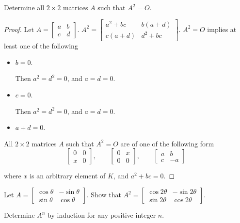 \begin{exercise}
    Determine all $2\times 2$ matrices $A$ such that $A^{2} = O$.
\end{exercise}

\begin{proof}
    Let $A = \begin{bmatrix}a & b \\ c & d\end{bmatrix}$. $A^{2} = \begin{bmatrix}a^{2} + bc & b(a + d) \\ c(a + d) & d^{2} + bc\end{bmatrix}$. $A^{2} = O$ implies at least one of the following
    \begin{itemize}
        \item $b = 0$.

              Then $a^{2} = d^{2} = 0$, and $a = d = 0$.
        \item $c = 0$.

              Then $a^{2} = d^{2} = 0$, and $a = d = 0$.
        \item $a + d = 0$.
    \end{itemize}

    All $2\times 2$ matrices $A$ such that $A^{2} = O$ are of one of the following form
    \[
        \begin{bmatrix}
            0 & 0 \\
            x & 0
        \end{bmatrix},\qquad
        \begin{bmatrix}
            0 & x \\
            0 & 0
        \end{bmatrix},\qquad
        \begin{bmatrix}
            a & b  \\
            c & -a
        \end{bmatrix}
    \]

    where $x$ is an arbitrary element of $K$, and $a^{2} + bc = 0$.
\end{proof}

\begin{exercise}
    Let $A = \begin{bmatrix}\cos\theta & -\sin\theta \\ \sin\theta & \cos\theta\end{bmatrix}$. Show that $A^{2} = \begin{bmatrix}\cos{2\theta} & -\sin{2\theta} \\ \sin{2\theta} & \cos{2\theta}\end{bmatrix}$.

    Determine $A^{n}$ by induction for any positive integer $n$.
\end{exercise}

